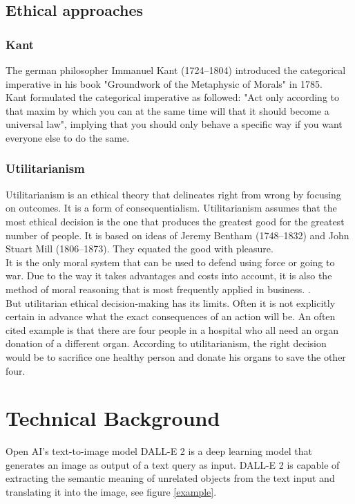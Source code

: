 \documentclass[9.5pt,twocolumn,twoside]{osajnl}
\begin{document}
\subsection{Ethical approaches}

\subsubsection{Kant}
The german philosopher Immanuel Kant (1724--1804) introduced the categorical imperative in his book "Groundwork of the Metaphysic of Morals" in 1785. \\
Kant formulated the categorical imperative as followed: "Act only according to that maxim by which you can at the same time will that it should become a universal law", implying that you should only behave a specific way if you want everyone else to do the same.

\subsubsection{Utilitarianism}
Utilitarianism is an ethical theory that delineates right from wrong by focusing on outcomes. It is a form of consequentialism.
Utilitarianism assumes that the most ethical decision is the one that produces the greatest good for the greatest number of people. It is based on ideas of Jeremy Bentham (1748--1832) and John Stuart Mill (1806--1873). They equated the good with pleasure.\\
It is the only moral system that can be used to defend using force or going to war. Due to the way it takes advantages and costs into account, it is also the method of moral reasoning that is most frequently applied in business. \cite{EthicsUnwrapped}. \\
But utilitarian ethical decision-making has its limits. Often it is not explicitly certain in advance what the exact consequences of an action will be. 
An often cited example is that there are four people in a hospital who all need an organ donation of a different organ. According to utilitarianism, the right decision would be to sacrifice one healthy person and donate his organs to save the other four.

\section{Technical Background}
Open AI's text-to-image model DALL-E 2 is a deep learning model that generates an image as output of a text query as input. DALL-E 2 is capable of extracting the semantic meaning of unrelated objects from the text input and translating it into the image, see figure \ref{example}.\\
\end{document}
